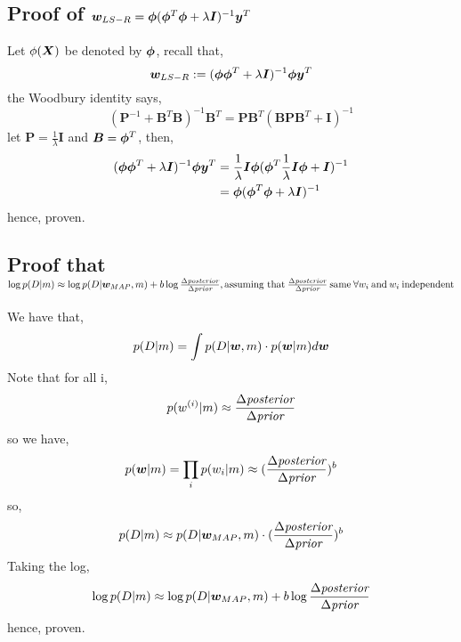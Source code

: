 \begin{appendices}
\subsection{Proof of \texorpdfstring{$\bm{w}_{LS-R} = \bm{\phi} ( \bm{\phi}^{T} \bm{\phi} + \lambda \bm{I})^{-1} \bm{y}^{T}$}{TEXT}} \label{proof:wlsr-woodbury}
Let $\phi(\bm{X})$ be denoted by $\bm{\phi}$, recall that,
\begin{equation}
    \bm{w}_{LS-R} := (\bm{\phi} \bm{\phi}^{T} + \lambda \bm{I})^{-1} \bm{\phi} \bm{y}^{T}
\end{equation}
the Woodbury identity says,
\begin{equation}
    (\bm{P}^{-1} + \bm{B}^{T} \bm{B})^{-1} \bm{B}^{T} = \bm{P} \bm{B}^{T} (\bm{B} \bm{P} \bm{B}^{T} + \bm{I})^{-1}
\end{equation}
let $\bm{P} = \frac{1}{\lambda} \bm{I}$ and $ \bm{B} = \bm{\phi}^{T}$, then,
\begin{align}
    (\bm{\phi} \bm{\phi}^{T} + \lambda \bm{I})^{-1} \bm{\phi} \bm{y}^{T} &{} = \frac{1}{\lambda} \bm{I} \bm{\phi} (\bm{\phi}^{T} \frac{1}{\lambda} \bm{I} \bm{\phi} + \bm{I})^{-1} \\
    &= \bm{\phi} (\bm{\phi}^{T} \bm{\phi} + \lambda \bm{I})^{-1}
\end{align} 
hence, proven. 

\subsection{Proof that \texorpdfstring{$\log p(D|m) \approx \log p(D| \bm{w}_{MAP} , m) + b \log \frac{\Delta \textit{posterior}}{\Delta \textit{prior}}, \\ \text{assuming that} \: \frac{\Delta \textit{posterior}}{\Delta \textit{prior}} \: \text{same} \: \forall w_{i} \: \text{and} \: w_{i} \: \text{independent} $}{TEXT}} \label{proof:log-model-evidence-b}
We have that,
\begin{equation}
    p(D|m) = \int p(D|\bm{w},m) \cdot p(\bm{w}|m) d\bm{w}
\end{equation}
Note that for all i,
\begin{equation}
    p(w^{(i)}|m) \approx \frac{\Delta \textit{posterior}}{\Delta \textit{prior}}
\end{equation}
so we have,
\begin{equation}
    p(\bm{w} |m) = \prod_{i} p(w_{i} |m) \approx (\frac{\Delta \textit{posterior}}{\Delta \textit{prior}})^{b}
\end{equation}
so,
\begin{equation}
    p(D|m) \approx p(D| \bm{w}_{MAP} , m) \cdot (\frac{\Delta \textit{posterior}}{\Delta \textit{prior}})^{b}
\end{equation}
Taking the log,
\begin{equation}
    \log p(D|m) \approx \log p(D| \bm{w}_{MAP} , m) + b \log \frac{\Delta \textit{posterior}}{\Delta \textit{prior}}
\end{equation}
hence, proven. 


\end{appendices}
